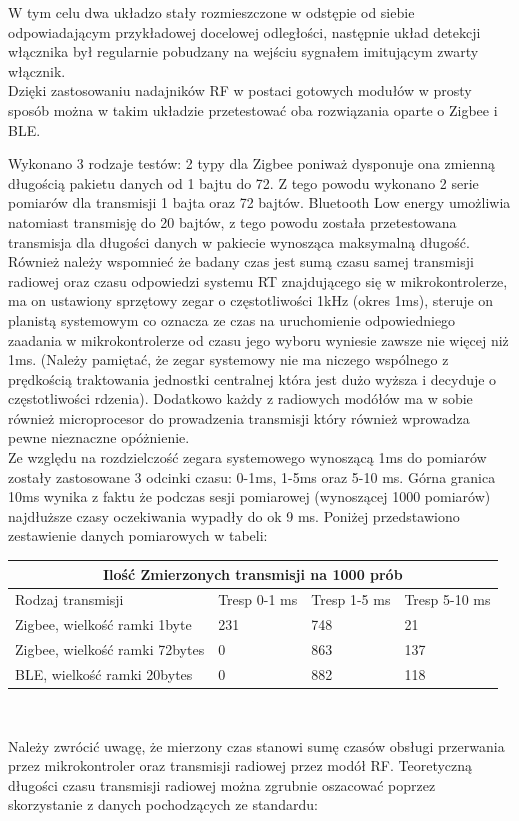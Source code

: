 W tym celu dwa układzo stały rozmieszczone w odstępie od siebie odpowiadającym przykładowej docelowej odległości, następnie układ detekcji włącznika był regularnie pobudzany na wejściu sygnałem imitującym zwarty włącznik. \\
\tab Dzięki zastosowaniu nadajników RF w postaci gotowych modułów w prosty sposób można w takim układzie przetestować oba rozwiązania oparte o Zigbee i BLE. \\

\par
\tab Wykonano 3 rodzaje testów: 2 typy dla Zigbee poniważ dysponuje ona zmienną długością pakietu danych od 1 bajtu do 72. Z tego powodu wykonano 2 serie pomiarów dla transmisji 1 bajta oraz 72 bajtów. Bluetooth Low energy umożliwia natomiast transmisję do 20 bajtów, z tego powodu została przetestowana transmisja dla długości danych w pakiecie wynosząca maksymalną długość. \\
Również należy wspomnieć że badany czas jest sumą czasu samej transmisji radiowej oraz czasu odpowiedzi systemu RT znajdującego się w mikrokontrolerze, ma on ustawiony sprzętowy zegar o częstotliwości 1kHz (okres 1ms), steruje on planistą systemowym co oznacza ze czas na uruchomienie odpowiedniego zaadania w mikrokontrolerze od czasu jego wyboru wyniesie zawsze nie więcej niż 1ms. (Należy pamiętać, że zegar systemowy nie ma niczego wspólnego z prędkością traktowania jednostki centralnej która jest dużo wyższa i decyduje o częstotliwości rdzenia). Dodatkowo każdy z radiowych modółów ma w sobie również microprocesor do prowadzenia transmisji który również wprowadza pewne nieznaczne opóżnienie.\\ 
Ze względu na rozdzielczość zegara systemowego wynoszącą 1ms do pomiarów zostały zastosowane 3 odcinki czasu: 0-1ms, 1-5ms oraz 5-10 ms. Górna granica 10ms wynika z faktu że podczas sesji pomiarowej (wynoszącej 1000 pomiarów) najdłuższe czasy oczekiwania wypadły do ok 9 ms.
Poniżej przedstawiono zestawienie danych pomiarowych w tabeli:
\mbox{}\\
\begin{tabular}{ |p{3cm}||p{3cm}|p{3cm}|p{3cm}|  }
 \hline
 \multicolumn{4}{|c|}{Ilość Zmierzonych transmisji na 1000 prób} \\
 \hline
 Rodzaj transmisji & Tresp 0-1 ms & Tresp 1-5 ms & Tresp 5-10 ms\\
 \hline
 Zigbee, wielkość ramki 1byte   & 231    & 748 &   21\\
 Zigbee, wielkość ramki 72bytes &   0  & 863   &137\\
 BLE, wielkość ramki 20bytes &0 & 882&  118\\
 \hline
\end{tabular}
\mbox{}\\
\par
\tab Należy zwrócić uwagę, że mierzony czas stanowi sumę czasów obsługi przerwania przez mikrokontroler oraz transmisji radiowej przez modół RF.
Teoretyczną długości czasu transmisji radiowej można zgrubnie oszacować poprzez skorzystanie z danych pochodzących ze standardu: \\

